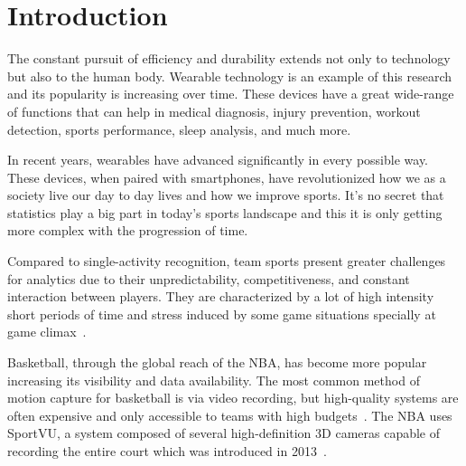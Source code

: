 

%

\chapter{Introduction}
\label{cha:introduction}

The constant pursuit of efficiency and durability extends not only to technology but also to the human body. Wearable technology is an example of this research and its popularity is increasing over time. 
These devices have a great wide-range of functions that can help in medical diagnosis, injury prevention, workout detection, sports performance, sleep analysis, and much more.

In recent years, wearables have advanced significantly in every possible way. These devices, when paired with smartphones, have revolutionized how we as a society live our day to day lives and how 
we improve sports. It's no secret that statistics play a big part in today's sports landscape and this it is only getting more complex with the progression of time.

Compared to single-activity recognition, team sports present greater challenges for analytics due to their unpredictability, competitiveness, and constant interaction between players. 
They are characterized by a lot of high intensity short periods of time and stress induced by some game situations specially at game climax~\cite{performanceAndTactics}. 

Basketball, through the global reach of the NBA, has become more popular increasing its visibility and data availability. The most common method
of motion capture for basketball is via video recording, but high-quality systems are often expensive and only accessible to teams with high budgets~\cite{basketballMotions}. 
The NBA uses SportVU, a system composed of several high-definition 3D cameras capable of recording the entire court which was introduced in 2013~\cite{basketballFootwork}.



